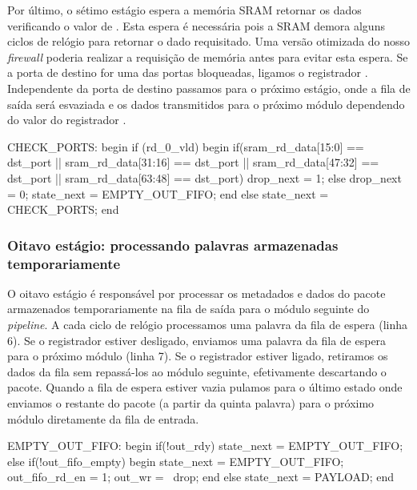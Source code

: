 Por último, o sétimo estágio espera a memória SRAM retornar os dados
verificando o valor de .  Esta espera é necessária pois a
SRAM demora alguns ciclos de relógio para retornar o dado requisitado.
Uma versão otimizada do nosso \emph{firewall} poderia realizar a
requisição de memória antes para evitar esta espera.  Se a porta de
destino for uma das portas bloqueadas, ligamos o registrador .
Independente da porta de destino passamos para o próximo estágio, onde a
fila de saída será esvaziada e os dados transmitidos para o próximo
módulo dependendo do valor do registrador .

\begin{verilogcode}
      CHECK_PORTS: begin
         if (rd_0_vld) begin
            if(sram_rd_data[15:0] == dst_port ||
                   sram_rd_data[31:16] == dst_port ||
                   sram_rd_data[47:32] == dst_port ||
                   sram_rd_data[63:48] == dst_port)
               drop_next = 1;
            else
               drop_next = 0;
            state_next = EMPTY_OUT_FIFO;
         end
         else
            state_next = CHECK_PORTS;
      end
\end{verilogcode}

\subsubsection*{Oitavo estágio: processando palavras armazenadas
temporariamente}

O oitavo estágio é responsável por processar os metadados e dados do
pacote armazenados temporariamente na fila de saída para o módulo
seguinte do \emph{pipeline}.  A cada ciclo de relógio processamos uma
palavra da fila de espera (linha 6).  Se o registrador 
estiver desligado, enviamos uma palavra da fila de espera para o próximo
módulo (linha 7).  Se o registrador  estiver ligado, retiramos
os dados da fila sem repassá-los ao módulo seguinte, efetivamente
descartando o pacote.  Quando a fila de espera estiver vazia pulamos
para o último estado onde enviamos o restante do pacote (a partir da
quinta palavra) para o próximo módulo diretamente da fila de entrada.

\begin{verilogcode}
      EMPTY_OUT_FIFO: begin
         if(!out_rdy)
            state_next = EMPTY_OUT_FIFO;
         else if(!out_fifo_empty) begin
            state_next = EMPTY_OUT_FIFO;
            out_fifo_rd_en = 1;
            out_wr = ~drop;
         end
         else
            state_next = PAYLOAD;
      end
\end{verilogcode}

